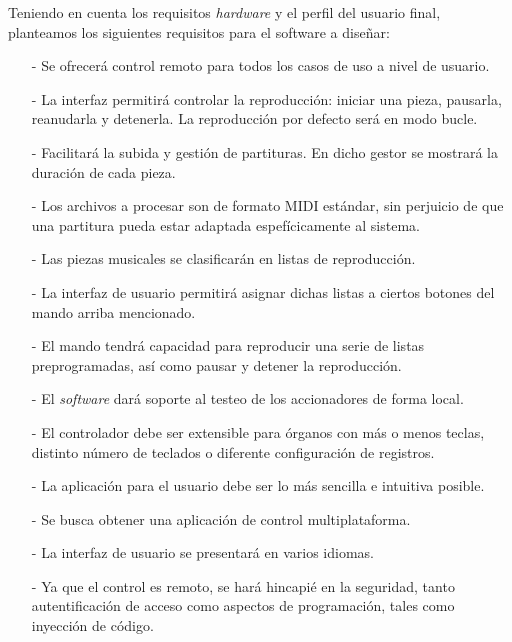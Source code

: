 Teniendo en cuenta los requisitos \textit{hardware} y el perfil del usuario final, planteamos los siguientes requisitos para el software a diseñar:

\begin{itemize}

	\item[-] Se ofrecerá control remoto para todos los casos de uso a nivel de usuario.
	
	\item[-] La interfaz permitirá controlar la reproducción: iniciar una pieza, pausarla, reanudarla y detenerla. La reproducción por defecto será en modo bucle.
	
	\item[-] Facilitará la subida y gestión de partituras. En dicho gestor se mostrará la duración de cada pieza.
	
	\item[-] Los archivos a procesar son de formato MIDI estándar, sin perjuicio de que una partitura pueda estar adaptada espefícicamente al sistema.
	
	\item[-] Las piezas musicales se clasificarán en listas de reproducción.
	
	\item[-] La interfaz de usuario permitirá asignar dichas listas a ciertos botones del mando arriba mencionado.
	
	\item[-] El mando tendrá capacidad para reproducir una serie de listas preprogramadas, así como pausar y detener la reproducción.
	
	\item[-] El \textit{software} dará soporte al testeo de los accionadores de forma local.
	
	\item[-] El controlador debe ser extensible para órganos con más o menos teclas, distinto número de teclados o diferente configuración de registros.
	
	\item[-] La aplicación para el usuario debe ser lo más sencilla e intuitiva posible.
	
	\item[-] Se busca obtener una aplicación de control multiplataforma.
	
	\item[-] La interfaz de usuario se presentará en varios idiomas.
	
	\item[-] Ya que el control es remoto, se hará hincapié en la seguridad, tanto autentificación de acceso como aspectos de programación, tales como inyección de código.

\end{itemize}

